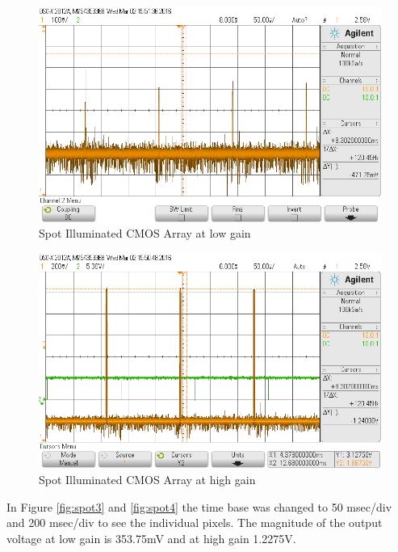 \begin{figure}[H]
\begin{center}
\includegraphics[scale=0.4]{LabFour/scope_79}
\end{center}
\caption{Spot Illuminated CMOS Array at low gain}
\label{fig:spot1}
\end{figure}

\begin{figure}[H]
\begin{center}
\includegraphics[scale=0.4]{LabFour/scope_78}
\end{center}
\caption{Spot Illuminated CMOS Array at high gain}
\label{fig:spot2}
\end{figure}


In Figure \ref{fig:spot3} and \ref{fig:spot4} the time base was changed to 50 msec/div and 200 msec/div to see the individual pixels.
The magnitude of the output voltage at low gain is 353.75mV and at high gain 1.2275V.


